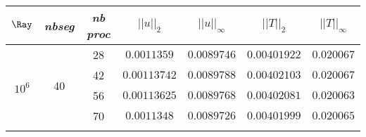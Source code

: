 \begin{table} [!ht]
	\begin{center}
		\begin{tabular}{|*{7}{c|}}
			\hline
			 $\Ray$ & \em{nbseg} & \em{nb proc }                    & $||u||_{2}$                        & $||u||_{\infty}$                & $||T||_{2}$              & $||T||_{\infty}$\\ \hline \hline
			\multirow{12}{*}{$10^6$}& \multirow{4}{*}{40} & 28 & $0.0011359$ & $0.0089746$ & $ 0.00401922 $ & $0.020067$ \\%
			\cline{3-7}
			& & 42 & $0.00113742$ & $0.0089788$ & $ 0.00402103 $ & $0.020067$  \\ \cline{3-7} %
			& & 56 & $0.00113625$ & $0.0089768$ & $ 0.00402081 $ & $0.020063$   \\ \cline{3-7}%
			& & 70 & $0.0011348$ & $0.0089726$ & $ 0.00401999 $ & $0.020065$  \\ \cline{2-7} %

\end{tabular}
\end{center}
\end{table}

